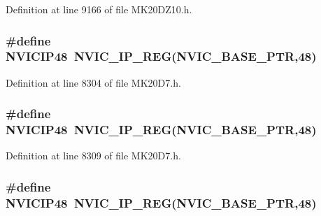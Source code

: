 Definition at line 9166 of file M\+K20\+D\+Z10.\+h.

\subsubsection[{\texorpdfstring{N\+V\+I\+C\+I\+P48}{NVICIP48}}]{\setlength{\rightskip}{0pt plus 5cm}\#define N\+V\+I\+C\+I\+P48~{\bf N\+V\+I\+C\+\_\+\+I\+P\+\_\+\+R\+EG}({\bf N\+V\+I\+C\+\_\+\+B\+A\+S\+E\+\_\+\+P\+TR},48)}\hypertarget{group___n_v_i_c___register___accessor___macros_ga49a25ed1872bb62cbf8d0e5b8060b70a}{}\label{group___n_v_i_c___register___accessor___macros_ga49a25ed1872bb62cbf8d0e5b8060b70a}


Definition at line 8304 of file M\+K20\+D7.\+h.

\subsubsection[{\texorpdfstring{N\+V\+I\+C\+I\+P48}{NVICIP48}}]{\setlength{\rightskip}{0pt plus 5cm}\#define N\+V\+I\+C\+I\+P48~{\bf N\+V\+I\+C\+\_\+\+I\+P\+\_\+\+R\+EG}({\bf N\+V\+I\+C\+\_\+\+B\+A\+S\+E\+\_\+\+P\+TR},48)}\hypertarget{group___n_v_i_c___register___accessor___macros_ga49a25ed1872bb62cbf8d0e5b8060b70a}{}\label{group___n_v_i_c___register___accessor___macros_ga49a25ed1872bb62cbf8d0e5b8060b70a}


Definition at line 8309 of file M\+K20\+D7.\+h.

\subsubsection[{\texorpdfstring{N\+V\+I\+C\+I\+P48}{NVICIP48}}]{\setlength{\rightskip}{0pt plus 5cm}\#define N\+V\+I\+C\+I\+P48~{\bf N\+V\+I\+C\+\_\+\+I\+P\+\_\+\+R\+EG}({\bf N\+V\+I\+C\+\_\+\+B\+A\+S\+E\+\_\+\+P\+TR},48)}\hypertarget{group___n_v_i_c___register___accessor___macros_ga49a25ed1872bb62cbf8d0e5b8060b70a}{}\label{group___n_v_i_c___register___accessor___macros_ga49a25ed1872bb62cbf8d0e5b8060b70a}


